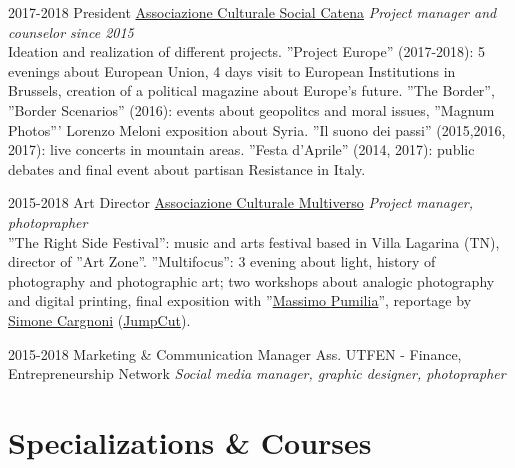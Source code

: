 \documentclass[]{friggeri-cv}
\begin{document}
\begin{entrylist}

\entry
    {2017-2018}
    {President}
    {\href{https://www.facebook.com/SocialCatena/}{Associazione Culturale Social Catena}}
    {\emph{Project manager and counselor since 2015}\\
    Ideation and realization of different projects. ''Project Europe'' (2017-2018): 5 evenings about European Union, 4 days visit to European Institutions in Brussels, creation of a political magazine about Europe's future. ''The Border'', ''Border Scenarios'' (2016): events about geopolitcs and moral issues, ''Magnum Photos''' Lorenzo Meloni exposition about Syria. ''Il suono dei passi'' (2015,2016, 2017): live concerts in mountain areas. ''Festa d’Aprile'' (2014, 2017): public debates and final event about partisan Resistance in Italy.
    }

\entry
    {2015-2018}
    {Art Director}
    {\href{https://www.facebook.com/Asso.Multiverso/}{Associazione Culturale Multiverso}}
    {\emph{Project manager, photoprapher}\\
    ''The Right Side Festival'': music and arts festival based in Villa Lagarina (TN), director of ''Art Zone''. ''Multifocus'': 3 evening about light, history of photography and photographic art; two workshops about analogic photography and digital printing, final exposition with ''\href{http://simonecargnoni.com/massimopumilia/}{Massimo Pumilia}'', reportage by \href{http://simonecargnoni.com}{Simone Cargnoni} (\href{http://www.jumpcut.it}{JumpCut}).
    }

\entry
    {2015-2018}
    {Marketing \& Communication Manager}
    {Ass. UTFEN - Finance, Entrepreneurship Network}
    {\emph{Social media manager, graphic designer, photoprapher}}

\end{entrylist}


\section{Specializations \& Courses}
\end{document}

